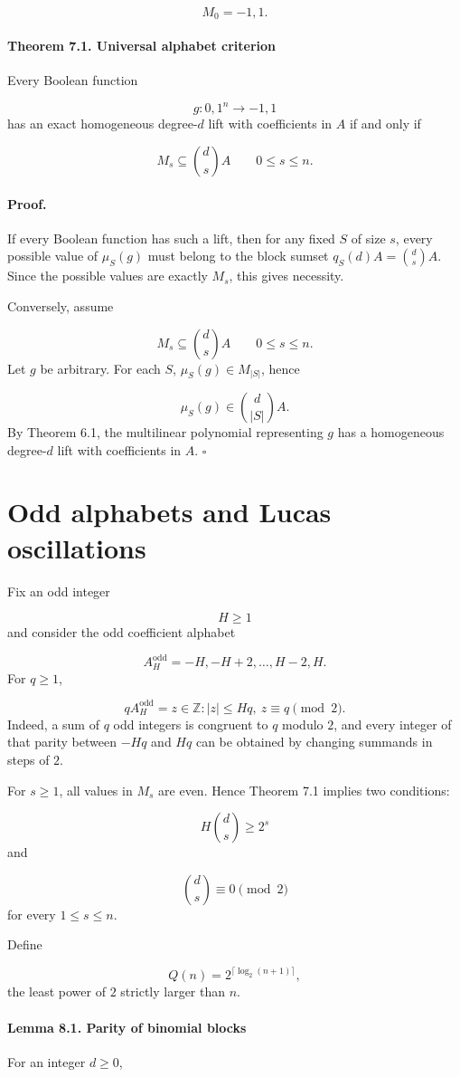 \documentclass[11pt]{article}
\theoremstyle{definition}
\begin{document}
\[
M_0={-1,1}.
\]
\paragraph{Theorem 7.1. Universal alphabet criterion}
Every Boolean function

\[
g:{0,1}^n\to{-1,1}
\]
has an exact homogeneous degree-$d$ lift with coefficients in $A$ if and only if

\[
M_s
\subseteq
\binom ds A
\qquad
0\le s\le n.
\]
\paragraph{Proof.}
If every Boolean function has such a lift, then for any fixed $S$ of size $s$, every possible value of $\mu_S(g)$ must belong to the block sumset $q_S(d)A=\binom ds A$. Since the possible values are exactly $M_s$, this gives necessity.

Conversely, assume

\[
M_s\subseteq \binom ds A
\qquad
0\le s\le n.
\]
Let $g$ be arbitrary. For each $S$, $\mu_S(g)\in M_{|S|}$, hence

\[
\mu_S(g)\in \binom d{|S|}A.
\]
By Theorem 6.1, the multilinear polynomial representing $g$ has a homogeneous degree-$d$ lift with coefficients in $A$. $\square$

\section{Odd alphabets and Lucas oscillations}
Fix an odd integer

\[
H\ge1
\]
and consider the odd coefficient alphabet

\[
A_H^{\mathrm{odd}}
=
{-H,-H+2,\dots,H-2,H}.
\]
For $q\ge1$,

\[
qA_H^{\mathrm{odd}}
=
{z\in\mathbb{Z}: |z|\le Hq,\ z\equiv q\pmod2}.
\]
Indeed, a sum of $q$ odd integers is congruent to $q$ modulo $2$, and every integer of that parity between $-Hq$ and $Hq$ can be obtained by changing summands in steps of $2$.

For $s\ge1$, all values in $M_s$ are even. Hence Theorem 7.1 implies two conditions:

\[
H\binom ds\ge2^s
\]
and

\[
\binom ds\equiv0\pmod2
\]
for every $1\le s\le n$.

Define

\[
Q(n)=2^{\lceil\log_2(n+1)\rceil},
\]
the least power of $2$ strictly larger than $n$.

\paragraph{Lemma 8.1. Parity of binomial blocks}
For an integer $d\ge0$,
\end{document}
